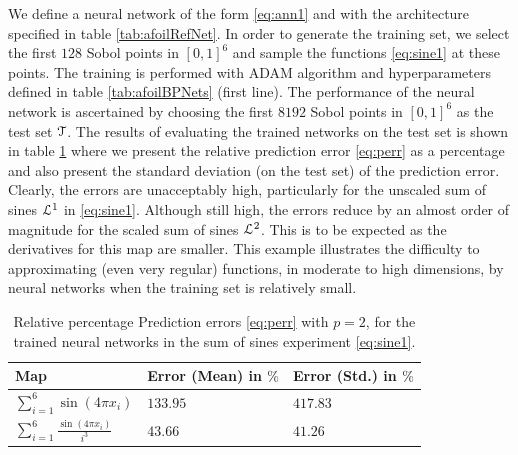 \documentclass[a4paper]{article}
\numberwithin{equation}{section}
\numberwithin{equation}{section}
\theoremstyle{definition}
\theoremstyle{myremarkstyle}
\newcommand{\map}{\EuScript{L}}
\newcommand{\test}{\EuScript{T}}
\begin{document}
We define a neural network of the form \eqref{eq:ann1} and with the architecture specified in table \ref{tab:afoilRefNet}. In order to generate the training set, we select the first $128$ Sobol points in $[0,1]^6$ and sample the functions \eqref{eq:sine1} at these points. The training is performed with ADAM algorithm and hyperparameters defined in table \ref{tab:afoilBPNets} (first line). The performance of the neural network is ascertained by choosing the first $8192$ Sobol points in $[0,1]^6$ as the test set $\test$. The results of evaluating the trained networks on the test set is shown in table \ref{tab:sine} where we present the relative prediction error \eqref{eq:perr} as a percentage and also present the standard deviation (on the test set) of the prediction error. Clearly, the errors are unacceptably high, particularly for the unscaled sum of sines $\map^1$ in \eqref{eq:sine1}. Although still high, the errors reduce by an almost order of magnitude for the scaled sum of sines $\map^2$. This is to be expected as the derivatives for this map are smaller. This example illustrates the difficulty to approximating (even very regular) functions, in moderate to high dimensions, by neural networks when the training set is relatively small. 

\begin{table}
    \centering
    \begin{tabular}{|l|l|l|}
    \hline
        Map & Error (Mean) in $\%$ & Error (Std.) in $\%$ \\
    \hline
        $\sum_{i=1}^6 \sin(4\pi x_i)$ & $133.95$ & $417.83$ \\
        \hline
        $\sum_{i=1}^6 \frac{\sin(4\pi x_i)}{i^3}$ & $43.66$ & $41.26$ \\
        \hline
    \end{tabular}
    \caption{Relative percentage Prediction errors \eqref{eq:perr} with $p=2$, for the trained neural networks in the sum of sines experiment \eqref{eq:sine1}.}
    \label{tab:sine}
\end{table}
\end{document}
